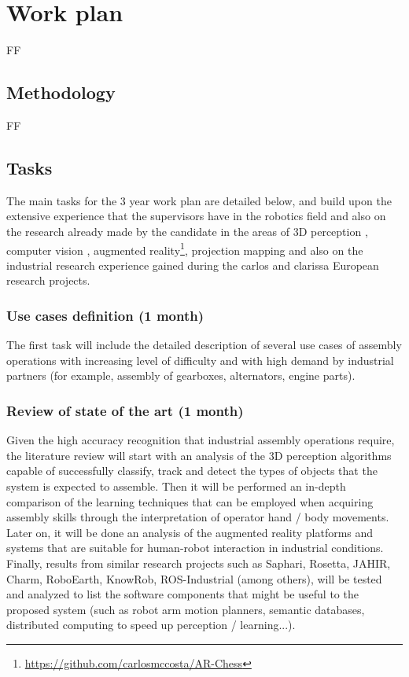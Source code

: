 \chapter{Work plan}\label{chap:work-plan}

FF


\section{Methodology}

FF


\section{Tasks}

The main tasks for the 3 year work plan are detailed below, and build upon the extensive experience that the supervisors have in the robotics field and also on the research already made by the candidate in the areas of 3D perception \cite{Costa2015Diss,Costa2015ICIT,Costa2015Intech,Costa2016Elsevier}, computer vision \cite{Costa2014,Costa2016ICARSC}, augmented reality\footnote{\url{https://github.com/carlosmccosta/AR-Chess}}, projection mapping and also on the industrial research experience gained during the \gls{carlos} and \gls{clarissa} European research projects.



\subsection{Use cases definition (1 month)}

The first task will include the detailed description of several use cases of assembly operations with increasing level of difficulty and with high demand by industrial partners (for example, assembly of gearboxes, alternators, engine parts).


\subsection{Review of state of the art (1 month)}

Given the high accuracy recognition that industrial assembly operations require, the literature review will start with an analysis of the 3D perception algorithms capable of successfully classify, track and detect the types of objects that the system is expected to assemble. Then it will be performed an in-depth comparison of the learning techniques that can be employed when acquiring assembly skills through the interpretation of operator hand / body movements. Later on, it will be done an analysis of the augmented reality platforms and systems that are suitable for human-robot interaction in industrial conditions.
Finally, results from similar research projects such as Saphari, Rosetta, JAHIR, Charm, RoboEarth, KnowRob, ROS-Industrial (among others), will be tested and analyzed to list the software components that might be useful to the proposed system (such as robot arm motion planners, semantic databases, distributed computing to speed up perception / learning...).


